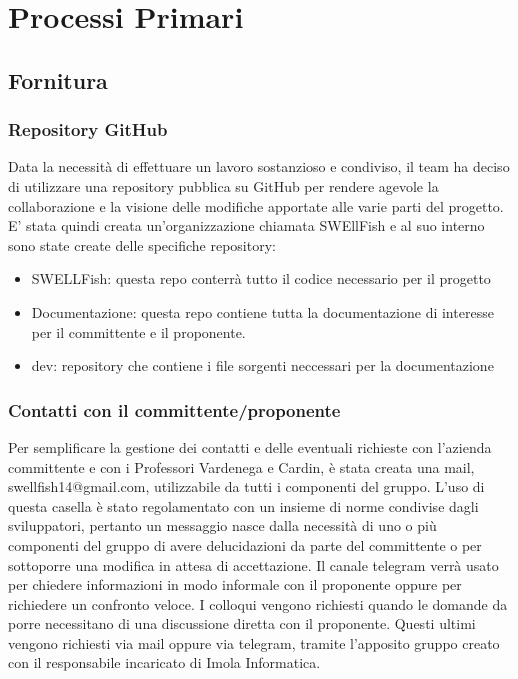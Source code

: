 \documentclass[12pt]{article}
\begin{document}
\section{Processi Primari}
\subsection{Fornitura}
\subsubsection{Repository GitHub}
Data la necessità di effettuare un lavoro sostanzioso e condiviso, il team ha deciso di utilizzare una repository pubblica su GitHub per rendere agevole la collaborazione e la visione delle modifiche apportate alle varie parti del progetto.
E' stata quindi creata un'organizzazione chiamata SWEllFish e al suo interno sono state create delle specifiche repository:

\begin{itemize}
    \item SWELLFish: questa repo conterrà tutto il codice necessario per il progetto
    \item Documentazione: questa repo contiene tutta la documentazione di interesse per il committente e il proponente.
    \item dev: repository che contiene i file sorgenti neccessari per la documentazione
\end{itemize}

\subsubsection{Contatti con il committente/proponente}
Per semplificare la gestione dei contatti e delle eventuali richieste con l'azienda committente e con i Professori Vardenega e Cardin, è stata creata una mail, swellfish14@gmail.com, utilizzabile da tutti i componenti del gruppo.
L'uso di questa casella è stato regolamentato con un insieme di norme condivise dagli sviluppatori, pertanto un messaggio nasce dalla necessità di uno o più componenti del gruppo di avere delucidazioni da parte del committente o per sottoporre una modifica in attesa di accettazione.
Il canale telegram verrà usato per chiedere informazioni in modo informale con il proponente oppure per richiedere un confronto veloce.
I colloqui vengono richiesti quando le domande da porre necessitano di una discussione diretta con il proponente.
Questi ultimi vengono richiesti via mail oppure via telegram, tramite l'apposito gruppo creato con il responsabile incaricato di Imola Informatica.
\end{document}
